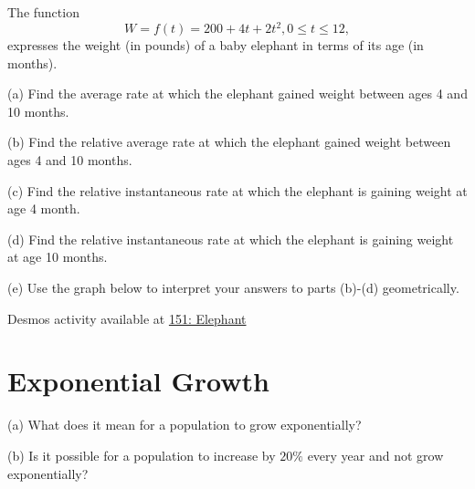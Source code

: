 \documentclass{ximera}
\begin{document}
\begin{question}  \label{Q:354rgbytt}
The function
\[
    W = f(t) = 200+4t +2t^2 , 0\leq t \leq 12 ,
\]
expresses the weight (in pounds) of a baby elephant in terms of its age (in months).

(a) Find the average rate at which the elephant gained weight between ages 4 and 10 months.

(b) Find the relative average rate at which the elephant gained weight between ages 4 and 10 months.

(c) Find the relative instantaneous rate at which the elephant is gaining weight at age 4 month.

(d) Find the relative instantaneous rate at which the elephant is gaining weight at age 10 months.

(e) Use the graph below to interpret your answers to parts (b)-(d) geometrically.


\begin{onlineOnly}
    \begin{center}
\end{center}
\end{onlineOnly}


Desmos activity available at \href{https://www.desmos.com/calculator/2xj6xy7ggo}{151: Elephant}



\end{question}



\section*{Exponential Growth}
\begin{question}  \label{Qr435rhgnbh}
(a) What does it mean for a population to grow exponentially?

(b) Is it possible for a population to increase by $20\%$ every year and not grow exponentially?
\end{question}
\end{document}
